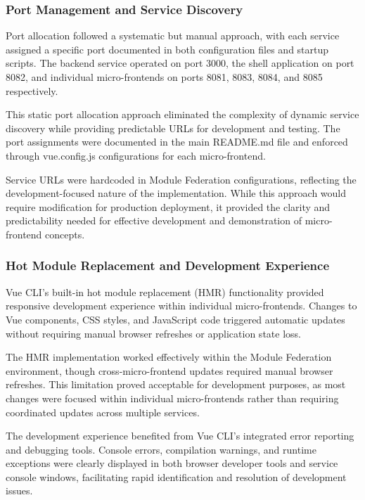 \documentclass[12pt,a4paper]{report}
\begin{document}
\subsubsection{Port Management and Service Discovery}

Port allocation followed a systematic but manual approach, with each service assigned a specific port documented in both configuration files and startup scripts. The backend service operated on port 3000, the shell application on port 8082, and individual micro-frontends on ports 8081, 8083, 8084, and 8085 respectively.

This static port allocation approach eliminated the complexity of dynamic service discovery while providing predictable URLs for development and testing. The port assignments were documented in the main README.md file and enforced through vue.config.js configurations for each micro-frontend.

Service URLs were hardcoded in Module Federation configurations, reflecting the development-focused nature of the implementation. While this approach would require modification for production deployment, it provided the clarity and predictability needed for effective development and demonstration of micro-frontend concepts.

\subsubsection{Hot Module Replacement and Development Experience}

Vue CLI's built-in hot module replacement (HMR) functionality provided responsive development experience within individual micro-frontends. Changes to Vue components, CSS styles, and JavaScript code triggered automatic updates without requiring manual browser refreshes or application state loss.

The HMR implementation worked effectively within the Module Federation environment, though cross-micro-frontend updates required manual browser refreshes. This limitation proved acceptable for development purposes, as most changes were focused within individual micro-frontends rather than requiring coordinated updates across multiple services.

The development experience benefited from Vue CLI's integrated error reporting and debugging tools. Console errors, compilation warnings, and runtime exceptions were clearly displayed in both browser developer tools and service console windows, facilitating rapid identification and resolution of development issues.
\end{document}
